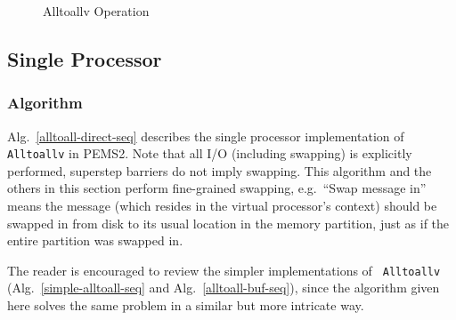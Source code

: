 \documentclass[12pt]{carletoncsthesis}
\begin{document}
\begin{figure}[ht]
\begin{center}
\caption{Alltoallv Operation}
\end{center}
\end{figure}

\clearpage
\subsection{Single Processor}


\subsubsection{Algorithm}


Alg.~\ref{alltoall-direct-seq} describes the single processor implementation of
{\tt Alltoallv} in PEMS2.  Note that all I/O (including swapping) is explicitly
performed, superstep barriers do not imply swapping.  This algorithm and the
others in this section perform fine-grained swapping, e.g.\ ``Swap message
in'' means the message (which resides in the virtual processor's context)
should be swapped in from disk to its usual location in the memory partition,
just as if the entire partition was swapped in.

The reader is encouraged to review the simpler implementations of {\tt
Alltoallv} (Alg.~\ref{simple-alltoall-seq} and Alg.~\ref{alltoall-buf-seq}),
since the algorithm given here solves the same problem in a similar but more
intricate way.
\end{document}
